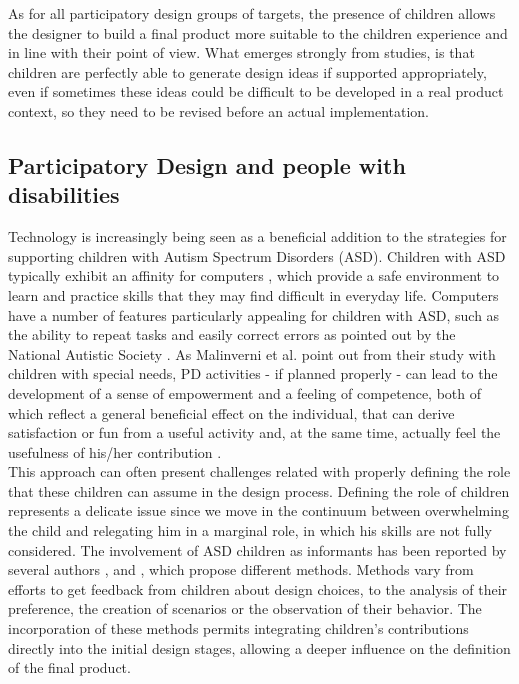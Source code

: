 As for all participatory design groups of targets, the presence of children allows the designer to build a final product more suitable to the children experience and in line with their point of view. What emerges strongly from studies, is that children are perfectly able to generate design ideas if supported appropriately, even if sometimes these ideas could be difficult to be developed in a real product context, so they need to be revised before an actual implementation.

\subsection{Participatory Design and people with disabilities}
Technology is increasingly being seen as a beneficial addition to the strategies for supporting children with Autism Spectrum Disorders (ASD). Children with ASD typically exhibit an affinity for computers , which provide a safe environment to learn and practice skills that they may find difficult in everyday life. Computers have a number of features particularly appealing for children with ASD, such as the ability to repeat tasks and easily correct errors as pointed out by the National Autistic Society \cite{NAS}. As Malinverni et al. point out from their study with children with special needs, PD activities - if planned properly - can lead to the development of a sense of empowerment and a feeling of competence, both of which reflect a general beneficial effect on the individual, that can derive satisfaction or fun from a useful activity and, at the same time, actually feel the usefulness of his/her contribution \cite{Malinverni}.\\
This approach can often present challenges related with properly defining the role that these children can assume in the design process. Defining the role of children represents a delicate issue since we move in the continuum between overwhelming the child and relegating him in a marginal role, in which his skills are not fully considered. The involvement of ASD children as informants has been reported by several authors \cite{Tredici},\cite{Sedici} and \cite{Venti}, which propose different methods. Methods vary from efforts to get feedback from children about design choices, to the analysis of their preference, the creation of scenarios or the observation of their behavior. The incorporation of these methods permits integrating children's contributions directly into the initial design stages, allowing a deeper influence on the definition of the final product. \\
